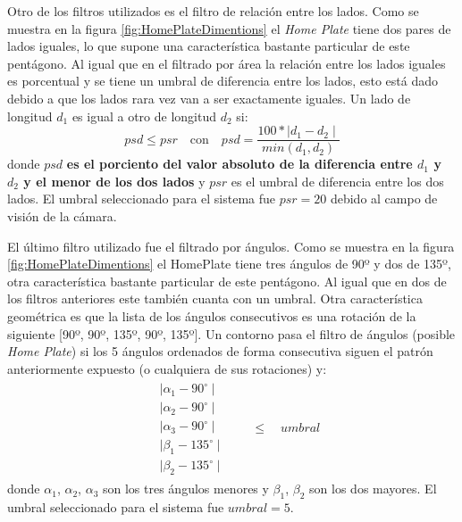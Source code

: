 Otro de los filtros utilizados es el filtro de relación entre los lados. Como se muestra en la figura \ref{fig:HomePlateDimentions} el \textit{Home Plate} tiene dos pares de lados iguales, lo que supone una característica bastante particular de este pentágono. Al igual que en el filtrado por área la relación entre los lados iguales es porcentual y se tiene un umbral de diferencia entre los lados, esto está dado debido a que los lados rara vez van a ser exactamente iguales. Un lado de longitud $d_1$ es igual a otro de longitud $d_2$ si:
$$psd \leq psr \quad \text{con} \quad psd = \frac{100 * \mid d_1 - d_2 \mid}{min(d_1, d_2)}$$
donde $psd$ \textbf{es el porciento del valor absoluto de la diferencia entre $d_1$ y $d_2$ y el menor de los dos lados} y $psr$ es el umbral de diferencia entre los dos lados. El umbral seleccionado para el sistema fue $psr = 20$ debido al campo de visión de la cámara.

El último filtro utilizado fue el filtrado por ángulos. Como se muestra en la figura \ref{fig:HomePlateDimentions} el HomePlate tiene tres ángulos de 90º y dos de 135º, otra característica bastante particular de este pentágono. Al igual que en dos de los filtros anteriores este también cuanta con un umbral. Otra característica geométrica es que la lista de los ángulos consecutivos es una rotación de la siguiente [90º, 90º, 135º, 90º, 135º]. Un contorno pasa el filtro de ángulos (posible \textit{Home Plate}) si los 5 ángulos ordenados de forma consecutiva siguen el patrón anteriormente expuesto (o cualquiera de sus rotaciones) y:
\begin{equation*}
	\begin{split}
		\begin{split}
			& \mid \alpha_1 - 90^{\circ} \mid \\
			& \mid \alpha_2 - 90^{\circ} \mid \\
			& \mid \alpha_3 - 90^{\circ} \mid \\
			& \mid \beta_1 - 135^{\circ} \mid \\
			& \mid \beta_2 - 135^{\circ} \mid
		\end{split}
		& \quad \leq \quad umbral
	\end{split}
\end{equation*}
donde $\alpha_1$, $\alpha_2$, $\alpha_3$ son los tres ángulos menores y $\beta_1$, $\beta_2$ son los dos mayores. El umbral seleccionado para el sistema fue $umbral = 5$.

